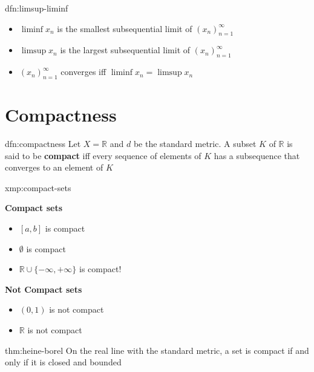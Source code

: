 \documentclass[landscape, 8pt]{extarticle}
\begin{document}
\begin{multicols}{3}
\begin{dfn}{dfn:limsup-liminf}{}
    \longrule{0.08ex}
    \begin{itemize}[leftmargin=*]
        \item $\liminf x_{n}$ is the smallest subsequential limit of $(x_{n})^{\infty}_{n=1}$
        \item $\limsup x_{n}$ is the largest subsequential limit of $(x_{n})^{\infty}_{n=1}$
        \item $(x_{n})^{\infty}_{n=1}$ converges iff $\liminf x_{n} = \limsup x_{n}$
    \end{itemize}
\end{dfn}

\newpage
\section{Compactness}

\begin{dfn}[Compactness]{dfn:compactness}{}
    Let $X = \mathbb{R}$ and $d$ be the standard metric. A subset $K$ of $\mathbb{R}$ is said to be \textbf{compact} iff every sequence of elements of $K$ has a subsequence that converges to an element of $K$
\end{dfn}

\begin{xmp}{xmp:compact-sets}{}
    \vspace{-13pt}
    \setlength{\columnseprule}{0.5pt}
    \begin{multicols}{2}
        \textbf{Compact sets}
        \begin{itemize}[leftmargin=*]
            \item $[a, b]$ is compact
            \item $\emptyset$ is compact
            \item $\mathbb{R} \cup \{-\infty, +\infty\}$ is compact!
        \end{itemize}

        \textbf{Not Compact sets}
        \begin{itemize}[leftmargin=*]
            \item $(0, 1)$ is not compact
            \item $\mathbb{R}$ is not compact
        \end{itemize}
    \end{multicols}
    \vspace{-3pt}
\end{xmp}

\vspace{-5pt}
\begin{thm}{thm:heine-borel}{}
    On the real line with the standard metric, a set is compact if and only if it is closed and bounded


\end{thm}
\end{multicols}
\end{document}
